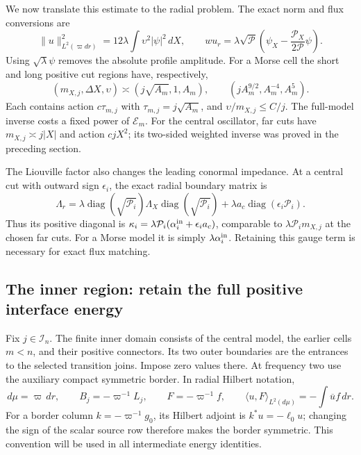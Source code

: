 We now translate this estimate to the radial problem.  The exact norm
and flux conversions are
\begin{equation}\label{eq:rad-eq-hn2}
 \|u\|_{L^2(\varpi dr)}^2=12\lambda\int\upsilon^2|\psi|^2\,dX,
 \qquad wu_r=\lambda\sqrt{\mathcal P}
       \left(\psi_X-\frac{\mathcal P_X}{2\mathcal P}\psi\right).
\end{equation}
Using $\sqrt\lambda\psi$ removes the absolute profile amplitude.
For a Morse cell the short and long positive cut regions have,
respectively,
\[
 (m_{X,j},\Delta X,\upsilon)
 \asymp(j\sqrt{A_m},1,A_m),\qquad
 (jA_m^{9/2},A_m^{-4},A_m^5).
\]
Each contains action $c\tau_{m,j}$ with
$\tau_{m,j}=j\sqrt{A_m}$, and $\upsilon/m_{X,j}\le C/j$.
The full-model inverse costs a fixed power of $\mathcal E_m$.
For the central oscillator, far cuts have
$m_{X,j}\asymp j|X|$ and action $cjX^2$; its two-sided weighted
inverse was proved in the preceding section.

The Liouville factor also changes the leading conormal impedance.
At a central cut with outward sign $\epsilon_i$, the exact radial
boundary matrix is
\begin{equation}\label{eq:rad-eq-hn3}
 \Lambda_r=\lambda\operatorname{diag}(\sqrt{\mathcal P_i})
                  \Lambda_X\operatorname{diag}(\sqrt{\mathcal P_i})
          +\lambda a_c\operatorname{diag}(\epsilon_i\mathcal P_i).
\end{equation}
Thus its positive diagonal is
$\kappa_i=\lambda\mathcal P_i(\alpha_i^{\rm in}+\epsilon_i a_c)$,
comparable to $\lambda\mathcal P_i m_{X,j}$ at the chosen far cuts.
For a Morse model it is simply $\lambda\alpha_i^{\rm in}$.
Retaining this gauge term is necessary for exact flux matching.

\subsection{The inner region: retain the full positive interface energy}
\label{subsec:rad-localized-hilbert-assembly}

Fix $j\in\mathcal I_n$.  The finite inner domain consists of the
central model, the earlier cells $m<n$, and their positive connectors.
Its two outer boundaries are the entrances to the selected transition
joins.  Impose zero values there.  At frequency two use the auxiliary
compact symmetric border.  In radial Hilbert notation,
\begin{equation}\label{eq:rad-eq-hn1}
 d\mu=\varpi\,dr,\qquad B_j=-\varpi^{-1}L_j,
 \qquad F=-\varpi^{-1}f,\qquad
 \langle u,F\rangle_{L^2(d\mu)}=-\int\overline u f\,dr.
\end{equation}
For a border column $k=-\varpi^{-1}g_0$, its Hilbert adjoint is
$k^*u=-\ell_0u$; changing the sign of the scalar source row therefore
makes the border symmetric.  This convention will be used in all
intermediate energy identities.

